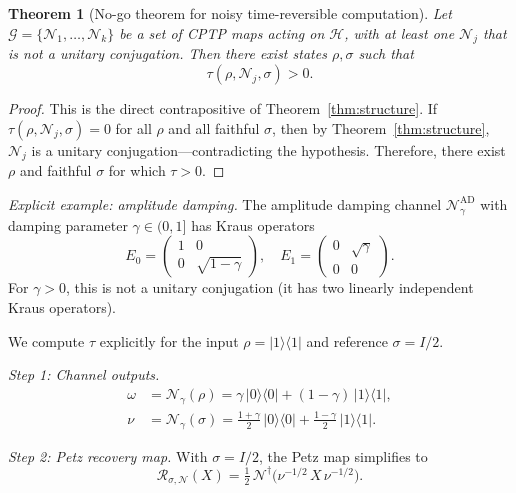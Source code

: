 \documentclass[prl,twocolumn,superscriptaddress,longbibliography]{revtex4-2}
\newtheorem{theorem}{Theorem}
\newcommand{\Petz}{\mathcal{R}}
\newcommand{\chan}{\mathcal{N}}
\newcommand{\hilb}{\mathcal{H}}
\newcommand{\ket}[1]{|#1\rangle}
\newcommand{\bra}[1]{\langle#1|}
\newcommand{\tauasym}{\tau}
\begin{document}
\begin{theorem}[No-go theorem for noisy time-reversible computation]
\label{thm:nogo}
Let\/ $\mathcal{G} = \{\chan_1, \ldots, \chan_k\}$ be a set of
CPTP maps acting on $\hilb$, with at least one $\chan_j$ that is
not a unitary conjugation.  Then there exist states $\rho, \sigma$
such that
\begin{equation}
\tauasym(\rho, \chan_j, \sigma) > 0.
\end{equation}
\end{theorem}

\begin{proof}
This is the direct contrapositive of Theorem~\ref{thm:structure}.
If $\tauasym(\rho, \chan_j, \sigma) = 0$ for all $\rho$ and
all faithful $\sigma$, then by Theorem~\ref{thm:structure},
$\chan_j$ is a unitary conjugation---contradicting the hypothesis.
Therefore, there exist $\rho$ and faithful $\sigma$ for which
$\tauasym > 0$.
\end{proof}

\emph{Explicit example: amplitude damping.}
The amplitude damping channel $\chan_\gamma^{\mathrm{AD}}$
with damping parameter $\gamma \in (0,1]$ has Kraus operators
\begin{equation}
E_0 = \begin{pmatrix} 1 & 0 \\ 0 & \sqrt{1-\gamma} \end{pmatrix},
\quad
E_1 = \begin{pmatrix} 0 & \sqrt{\gamma} \\ 0 & 0 \end{pmatrix}.
\label{eq:AD_kraus}
\end{equation}
For $\gamma > 0$, this is not a unitary conjugation (it has two
linearly independent Kraus operators).

We compute $\tauasym$ explicitly for the input
$\rho = \ket{1}\!\bra{1}$ and reference $\sigma = I/2$.

\emph{Step 1: Channel outputs.}
\begin{align}
\omega &= \chan_\gamma(\rho)
= \gamma\,\ket{0}\!\bra{0} + (1-\gamma)\,\ket{1}\!\bra{1}, \\
\nu &= \chan_\gamma(\sigma)
= \tfrac{1+\gamma}{2}\,\ket{0}\!\bra{0}
+ \tfrac{1-\gamma}{2}\,\ket{1}\!\bra{1}.
\end{align}

\emph{Step 2: Petz recovery map.}
With $\sigma = I/2$, the Petz map simplifies to
\begin{equation}
\Petz_{\sigma,\chan}(X) = \tfrac{1}{2}\,\chan^\dagger\!\big(
\nu^{-1/2}\, X\, \nu^{-1/2}\big).
\end{equation}
\end{document}
